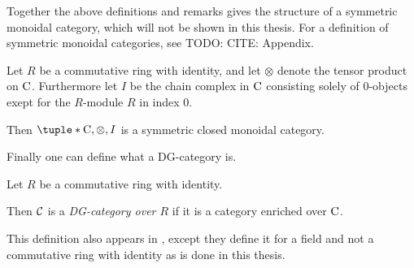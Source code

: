 Together the above definitions and remarks gives the structure of a symmetric monoidal category, which will not be shown in this thesis. For a definition of symmetric monoidal categories, see TODO: CITE: Appendix.

\begin{fact}
    Let \( R \) be a commutative ring with identity, and let \( \otimes \) denote the tensor product on \( \operatorname{C} \). Furthermore let \( I \) be the chain complex in \( \operatorname{C} \) consisting solely of \( 0 \)-objects exept for the \( R \)-module \( R \) in index \( 0 \).

    Then \( \tuple*{\C, \otimes, I} \) is a symmetric closed monoidal category.
\end{fact}

Finally one can define what a DG-category is.

\begin{definition}[DG-category]
    \label{def:dg_cat}
    Let \( R \) be a commutative ring with identity.

    Then \( {\mathcal{C}} \) is a \emph{DG-category over \( R \)} if it is a category enriched over \( \operatorname{C} \).
\end{definition}

This definition also appears in \cite[p. 29]{Jasso-Muro_2023}, except they define it for a field and not a commutative ring with identity as is done in this thesis.
